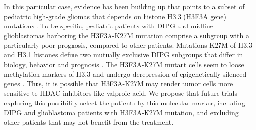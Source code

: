 In this particular case, evidence has been building up that points to a subset of pediatric high-grade gliomas that depends on histone H3.3 (H3F3A gene) mutations \cite{Wu_2012,Bender_2013,Venneti_2014,Solomon_2015}. To be specific, pediatric patients with DIPG and midline glioblastomas harboring the H3F3A-K27M mutation comprise a subgroup with a particularly poor prognosis, compared to other patients. Mutations K27M of H3.3 and H3.1 histones define two mutually exclusive DIPG subgroups that differ in biology, behavior and prognosis \cite{Castel_2015}. The H3F3A-K27M mutant cells seem to loose methylation markers of H3.3 and undergo derepression of epigenetically silenced genes \cite{Chan_2013}. Thus, it is possible that H3F3A-K27M may render tumor cells more sensitive to HDAC inhibitors like valproic acid. We propose that future trials exploring this possibility select the patients by this molecular marker, including DIPG and glioblastoma patients with H3F3A-K27M mutation, and excluding other patients that may not benefit from the treatment.